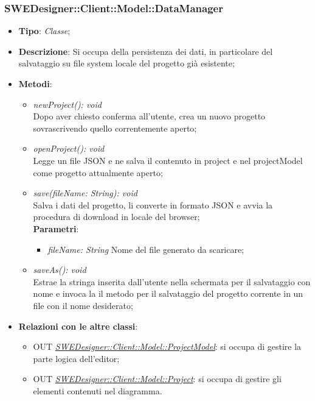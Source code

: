 \documentclass[../DefinizioneDiProdotto.tex]{subfiles}
\begin{document}
				\subsubsection{SWEDesigner::Client::Model::DataManager}
				\hypertarget{SWEDesigner::Client::Model::DataManager}{}
					\begin{itemize}
						\item \textbf{Tipo}: \emph{Classe};
						\item \textbf{Descrizione}: Si occupa della persistenza dei dati, in particolare del salvataggio su file system locale del progetto già esistente;\\
						\item \textbf{Metodi}:
						\begin{itemize}
							\item \emph{newProject(): void} \\
							Dopo aver chiesto conferma all'utente, crea un nuovo progetto sovrascrivendo quello correntemente aperto; \\
							\item \emph{openProject(): void} \\
							Legge un file JSON e ne salva il contenuto in project e nel projectModel come progetto attualmente aperto; \\
							\item \emph{save(fileName: String): void} \\
							Salva i dati del progetto, li converte in formato JSON e avvia la procedura di download in locale del browser; \\
							\textbf{Parametri}:
							\begin{itemize}
								\item \emph{fileName: String}
								Nome del file generato da scaricare; \\
							\end{itemize}
							\item \emph{saveAs(): void}\\
							Estrae la stringa inserita dall'utente nella schermata per il salvataggio con nome e invoca la il metodo per il salvataggio del progetto corrente in un file con il nome desiderato; \\
						\end{itemize}
						\item \textbf{Relazioni con le altre classi}:
						\begin{itemize}
							\item OUT \hyperlink{SWEDesigner::Client::Model::ProjectModel}{\emph{SWEDesigner::Client::Model::ProjectModel}}: si occupa di gestire la parte logica dell'editor;
							\item OUT \hyperlink{SWEDesigner::Client::Model::Project}{\emph{SWEDesigner::Client::Model::Project}}: si occupa di gestire gli elementi contenuti nel diagramma.
						\end{itemize}
					\end{itemize}
\end{document}

